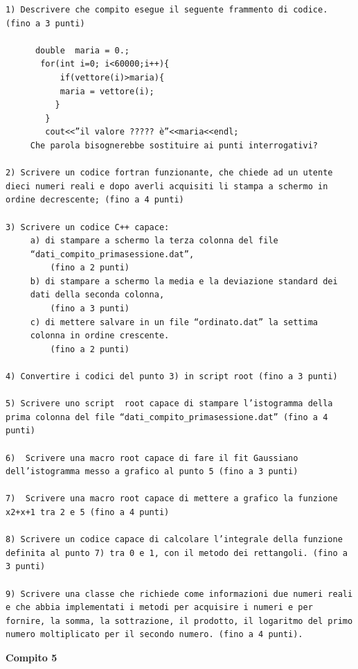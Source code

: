 \documentclass[11pt,fleqn]{book} %
\begin{document}
\begin{verbatim}
1) Descrivere che compito esegue il seguente frammento di codice. (fino a 3 punti)

      double  maria = 0.;
       for(int i=0; i<60000;i++){
           if(vettore(i)>maria){
           maria = vettore(i);
          }
        }
        cout<<”il valore ????? è”<<maria<<endl;
     Che parola bisognerebbe sostituire ai punti interrogativi?

2) Scrivere un codice fortran funzionante, che chiede ad un utente 
dieci numeri reali e dopo averli acquisiti li stampa a schermo in 
ordine decrescente; (fino a 4 punti)

3) Scrivere un codice C++ capace:
     a) di stampare a schermo la terza colonna del file 
     “dati_compito_primasessione.dat”, 
         (fino a 2 punti)
     b) di stampare a schermo la media e la deviazione standard dei 
     dati della seconda colonna,
         (fino a 3 punti)
     c) di mettere salvare in un file “ordinato.dat” la settima 
     colonna in ordine crescente.
         (fino a 2 punti)

4) Convertire i codici del punto 3) in script root (fino a 3 punti)

5) Scrivere uno script  root capace di stampare l’istogramma della 
prima colonna del file “dati_compito_primasessione.dat” (fino a 4 
punti)

6)  Scrivere una macro root capace di fare il fit Gaussiano 
dell’istogramma messo a grafico al punto 5 (fino a 3 punti)

7)  Scrivere una macro root capace di mettere a grafico la funzione 
x2+x+1 tra 2 e 5 (fino a 4 punti)

8) Scrivere un codice capace di calcolare l’integrale della funzione 
definita al punto 7) tra 0 e 1, con il metodo dei rettangoli. (fino a 
3 punti)

9) Scrivere una classe che richiede come informazioni due numeri reali 
e che abbia implementati i metodi per acquisire i numeri e per 
fornire, la somma, la sottrazione, il prodotto, il logaritmo del primo 
numero moltiplicato per il secondo numero. (fino a 4 punti).
\end{verbatim}

\textbf{Compito 5}
\end{document}
